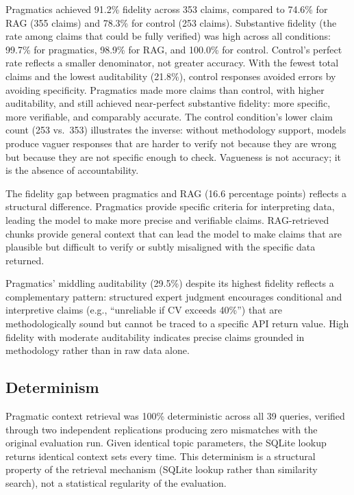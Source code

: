 \documentclass[
  11pt,
  letterpaper,
]{article}
\begin{document}
Pragmatics achieved 91.2\% fidelity across 353 claims, compared to
74.6\% for RAG (355 claims) and 78.3\% for control (253 claims).
Substantive fidelity (the rate among claims that could be fully
verified) was high across all conditions: 99.7\% for pragmatics, 98.9\%
for RAG, and 100.0\% for control. Control's perfect rate reflects a
smaller denominator, not greater accuracy. With the fewest total claims
and the lowest auditability (21.8\%), control responses avoided errors
by avoiding specificity. Pragmatics made more claims than control, with
higher auditability, and still achieved near-perfect substantive
fidelity: more specific, more verifiable, and comparably accurate. The
control condition's lower claim count (253 vs.~353) illustrates the
inverse: without methodology support, models produce vaguer responses
that are harder to verify not because they are wrong but because they
are not specific enough to check. Vagueness is not accuracy; it is the
absence of accountability.

The fidelity gap between pragmatics and RAG (16.6 percentage points)
reflects a structural difference. Pragmatics provide specific criteria
for interpreting data, leading the model to make more precise and
verifiable claims. RAG-retrieved chunks provide general context that can
lead the model to make claims that are plausible but difficult to verify
or subtly misaligned with the specific data returned.

Pragmatics' middling auditability (29.5\%) despite its highest fidelity
reflects a complementary pattern: structured expert judgment encourages
conditional and interpretive claims (e.g., ``unreliable if CV exceeds
40\%'') that are methodologically sound but cannot be traced to a
specific API return value. High fidelity with moderate auditability
indicates precise claims grounded in methodology rather than in raw data
alone.

\subsection{Determinism}\label{determinism}

Pragmatic context retrieval was 100\% deterministic across all 39
queries, verified through two independent replications producing zero
mismatches with the original evaluation run. Given identical topic
parameters, the SQLite lookup returns identical context sets every time.
This determinism is a structural property of the retrieval mechanism
(SQLite lookup rather than similarity search), not a statistical
regularity of the evaluation.
\end{document}
